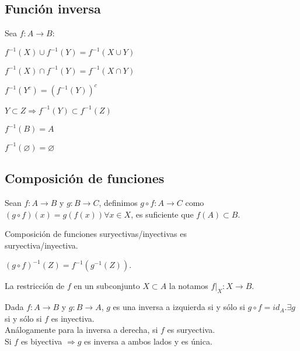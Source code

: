 \subsection{Función inversa}

Sea \(f: A \to B\):

\begin{prop}
    \(f^{-1}(X) \cup f^{-1}(Y) = f^{-1}{(X \cup Y)}\)
\end{prop}

\begin{prop}
    \(f^{-1}(X) \cap f^{-1}(Y) = f^{-1}(X \cap Y)\)
\end{prop}

\begin{prop}
    \(f^{-1}(Y^c) = {(f^{-1}(Y))}^c \)
\end{prop}

\begin{prop}
    \(Y \subset Z \Rightarrow f^{-1}(Y) \subset f^{-1}(Z)\)
\end{prop}

\begin{prop}
    \(f^{-1}(B) = A\)
\end{prop}

\begin{prop}
    \(f^{-1}(\varnothing) = \varnothing \)
\end{prop}

\subsection{Composición de funciones}

Sean \(f: A \to B\) y \(g: B \to C\), definimos \(g \circ f: A \to C\) como \((g \circ f)(x) = g(f(x)) \forall x \in X\), es suficiente que \(f(A) \subset B\).

\begin{prop}
    Composición de funciones suryectivas/inyectivas es \\ suryectiva/inyectiva.
\end{prop}

\begin{prop}
    \({(g \circ f)}^{-1}(Z) = f^{-1}(g^{-1}(Z))\).
\end{prop}

\begin{definition}
    La restricción de \(f\) en un subconjunto \(X \subset A\) la notamos \(f|_X: X \to B\).
\end{definition}

\begin{definition}
    Dada \(f: A \to B\) y \(g: B \to A\), \(g\) es una inversa a izquierda si y sólo si \(g \circ f = id_A\).\(\exists g\) si y sólo si \(f\) es inyectiva. \\
    Análogamente para la inversa a derecha, si \(f\) es suryectiva. \\
    Si \(f\) es biyectiva \(\Rightarrow g\) es inversa a ambos lados y es única.
\end{definition}

